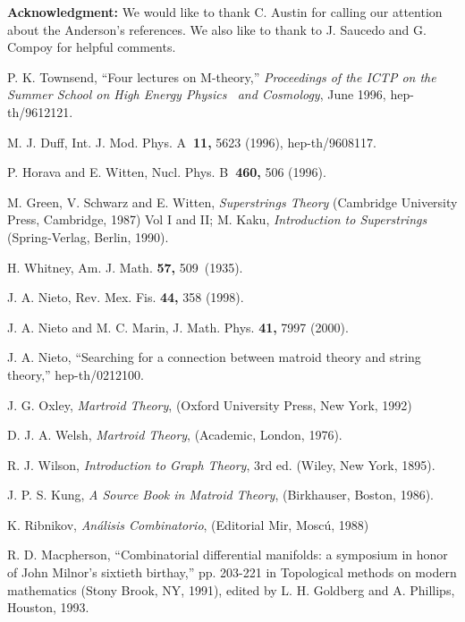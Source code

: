 \documentclass[a4paper,12pt]{article}
\begin{document}
\bigskip

\noindent \textbf{Acknowledgment:} We would like to thank C. Austin for
calling our attention about the Anderson's references. We also like to thank
to J. Saucedo and G. Compoy for helpful comments.

\bigskip

\begin{thebibliography}{99}
  P. K. Townsend, ``Four lectures on M-theory,'' \textit{%
Proceedings of the ICTP on the Summer School on High Energy Physics \ and
Cosmology}, June 1996, hep-th/9612121.

  M. J. Duff, Int. J. Mod. Phys. A\textbf{\ 11,} 5623 (1996),
hep-th/9608117.

  P. Horava and E. Witten, Nucl. Phys. B\textbf{\ 460,} 506
(1996).

  M. Green, V. Schwarz and E. Witten, \textit{Superstrings Theory}
(Cambridge University Press, Cambridge, 1987) Vol I and II; M. Kaku, \textit{%
Introduction to Superstrings} (Spring-Verlag, Berlin, 1990).

  H. Whitney, Am. J. Math. \textbf{57,} 509\ (1935).

  J. A. Nieto, Rev. Mex. Fis. \textbf{44,} 358 (1998).

  J. A. Nieto and M. C. Marin, J. Math. Phys. \textbf{41,} 7997
(2000).

  J. A. Nieto, ``Searching for a connection between matroid
theory and string theory,'' hep-th/0212100.

  J. G. Oxley, \textit{Martroid Theory}, (Oxford University
Press, New York, 1992)

  D. J. A. Welsh, \textit{Martroid Theory}, (Academic, London,
1976).

  R. J. Wilson, \textit{Introduction to Graph Theory}, 3rd ed.
(Wiley, New York, 1895).

  J. P. S. Kung, \textit{A Source Book in Matroid Theory},
(Birkhauser, Boston, 1986).

  K. Ribnikov, \textit{An\'{a}lisis Combinatorio}, (Editorial
Mir, Mosc\'{u}, 1988)

  R. D. Macpherson, ``Combinatorial differential manifolds: a
symposium in honor of John Milnor's sixtieth birthay,'' pp. 203-221 in
Topological methods on modern mathematics (Stony Brook, NY, 1991), edited by
L. H. Goldberg and A. Phillips, Houston, 1993.


\end{thebibliography}
\end{document}
